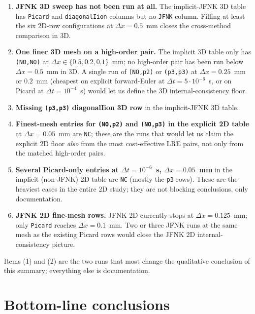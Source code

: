 \documentclass[11pt,a4paper]{article}
\newcommand{\code}[1]{\texttt{\small #1}}
\begin{document}
\begin{enumerate}[leftmargin=*]
\item \textbf{JFNK 3D sweep has not been run at all.} The
implicit-JFNK 3D table has \code{Picard} and \code{diagonalIion}
columns but no \code{JFNK} column. Filling at least the six 2D-row
configurations at $\Delta x = 0.5$~mm closes the cross-method
comparison in 3D.
\item \textbf{One finer 3D mesh on a high-order pair.} The implicit
3D table only has \code{(NO,NO)} at $\Delta x \in \{0.5, 0.2, 0.1\}$~mm;
no high-order pair has been run below $\Delta x = 0.5$~mm in 3D. A
single run of \code{(NO,p2)} or \code{(p3,p3)} at
$\Delta x = 0.25$~mm or $0.2$~mm (cheapest on explicit forward-Euler
at $\Delta t = 5\!\cdot\!10^{-6}$~s, or on Picard at
$\Delta t = 10^{-4}$~s) would let us define the 3D
internal-consistency floor.
\item \textbf{Missing \code{(p3,p3)} diagonalIion 3D row} in the
implicit-JFNK 3D table.
\item \textbf{Finest-mesh entries for \code{(NO,p2)} and \code{(NO,p3)}
in the explicit 2D table} at $\Delta x = 0.05$~mm are \code{NC};
these are the runs that would let us claim the explicit 2D floor
\emph{also} from the most cost-effective LRE pairs, not only from the
matched high-order pairs.
\item \textbf{Several Picard-only entries at $\Delta t = 10^{-6}$~s,
$\Delta x = 0.05$~mm} in the implicit (non-JFNK) 2D table are
\code{NC} (mostly the \code{p3} rows). These are the heaviest cases
in the entire 2D study; they are not blocking conclusions, only
documentation.
\item \textbf{JFNK 2D fine-mesh rows.} JFNK 2D currently stops at
$\Delta x = 0.125$~mm; only \code{Picard} reaches $\Delta x = 0.1$~mm.
Two or three JFNK runs at the same mesh as the existing Picard rows
would close the JFNK 2D internal-consistency picture.
\end{enumerate}

Items (1) and (2) are the two runs that most change the qualitative
conclusion of this summary; everything else is documentation.

\section{Bottom-line conclusions}
\label{sec:conclusions}
\end{document}
